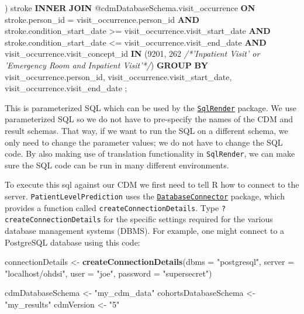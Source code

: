 \documentclass[]{article}
\newenvironment{Shaded}{\begin{snugshade}}{\end{snugshade}}
\newcommand{\KeywordTok}[1]{\textcolor[rgb]{0.13,0.29,0.53}{\textbf{#1}}}
\newcommand{\DataTypeTok}[1]{\textcolor[rgb]{0.13,0.29,0.53}{#1}}
\newcommand{\DecValTok}[1]{\textcolor[rgb]{0.00,0.00,0.81}{#1}}
\newcommand{\StringTok}[1]{\textcolor[rgb]{0.31,0.60,0.02}{#1}}
\newcommand{\CommentTok}[1]{\textcolor[rgb]{0.56,0.35,0.01}{\textit{#1}}}
\newcommand{\NormalTok}[1]{#1}
\begin{document}
\begin{Shaded}
\begin{Highlighting}[]
\NormalTok{) stroke}
\KeywordTok{INNER} \KeywordTok{JOIN}\NormalTok{ @cdmDatabaseSchema.visit_occurrence}
\KeywordTok{ON}\NormalTok{ stroke.person_id = visit_occurrence.person_id}
\KeywordTok{AND}\NormalTok{ stroke.condition_start_date >= visit_occurrence.visit_start_date}
\KeywordTok{AND}\NormalTok{ stroke.condition_start_date <= visit_occurrence.visit_end_date}
\KeywordTok{AND}\NormalTok{ visit_occurrence.visit_concept_id }\KeywordTok{IN}\NormalTok{ (}\DecValTok{9201}\NormalTok{, }\DecValTok{262} \CommentTok{/*'Inpatient Visit'  or }
\CommentTok{    'Emergency Room and Inpatient Visit'*/}\NormalTok{)}
\KeywordTok{GROUP} \KeywordTok{BY}\NormalTok{ visit_occurrence.person_id, visit_occurrence.visit_start_date, }
\NormalTok{         visit_occurrence.visit_end_date}
\NormalTok{;}
\end{Highlighting}
\end{Shaded}

This is parameterized SQL which can be used by the
\href{http://github.com/OHDSI/SqlRender}{\texttt{SqlRender}} package. We
use parameterized SQL so we do not have to pre-specify the names of the
CDM and result schemas. That way, if we want to run the SQL on a
different schema, we only need to change the parameter values; we do not
have to change the SQL code. By also making use of translation
functionality in \texttt{SqlRender}, we can make sure the SQL code can
be run in many different environments.

To execute this sql against our CDM we first need to tell R how to
connect to the server. \texttt{PatientLevelPrediction} uses the
\href{http://github.com/ohdsi/DatabaseConnector}{\texttt{DatabaseConnector}}
package, which provides a function called
\texttt{createConnectionDetails}. Type \texttt{?createConnectionDetails}
for the specific settings required for the various database management
systems (DBMS). For example, one might connect to a PostgreSQL database
using this code:

\begin{Shaded}
\begin{Highlighting}[]
\NormalTok{connectionDetails <-}\StringTok{ }\KeywordTok{createConnectionDetails}\NormalTok{(}\DataTypeTok{dbms =} \StringTok{"postgresql"}\NormalTok{, }
                                             \DataTypeTok{server =} \StringTok{"localhost/ohdsi"}\NormalTok{, }
                                             \DataTypeTok{user =} \StringTok{"joe"}\NormalTok{, }
                                             \DataTypeTok{password =} \StringTok{"supersecret"}\NormalTok{)}

\NormalTok{cdmDatabaseSchema <-}\StringTok{ "my_cdm_data"}
\NormalTok{cohortsDatabaseSchema <-}\StringTok{ "my_results"}
\NormalTok{cdmVersion <-}\StringTok{ "5"}
\end{Highlighting}
\end{Shaded}
\end{document}
